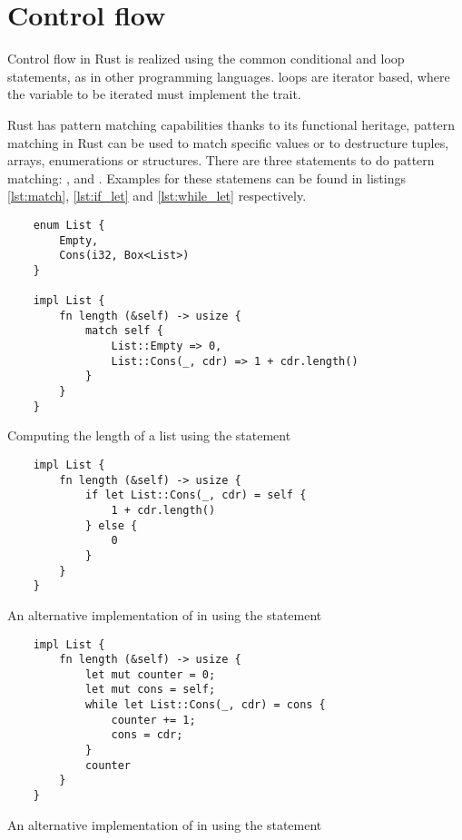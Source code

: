 \section{Control flow}

Control flow in Rust is realized using the common  conditional
and  loop statements, as in other programming languages.
 loops are iterator based, where the variable to be iterated must
implement the  trait.

Rust has pattern matching capabilities thanks to its functional heritage,
pattern matching in Rust can be used to match specific values or to destructure
tuples, arrays, enumerations or structures. There are three statements to do
pattern matching: ,  and .
Examples for these statemens can be found in listings \ref{lst:match},
\ref{lst:if_let} and \ref{lst:while_let} respectively.

\begin{listing}[ht]
	\begin{verbatim}
    enum List {
        Empty,
        Cons(i32, Box<List>)
    }

    impl List {
        fn length (&self) -> usize {
            match self {
                List::Empty => 0,
                List::Cons(_, cdr) => 1 + cdr.length()
            }
        } 
    }
    \end{verbatim}
    \caption{Computing the length of a list using the  statement}
  \label{lst:match}
\end{listing}

\begin{listing}[ht]
	\begin{verbatim}
    impl List {
        fn length (&self) -> usize {
            if let List::Cons(_, cdr) = self {
                1 + cdr.length()
            } else {
                0
            }
        } 
    }
    \end{verbatim}
    \caption{An alternative implementation of  in  using the  statement}
  \label{lst:if_let}
\end{listing}

\begin{listing}[ht]
	\begin{verbatim}
    impl List {
        fn length (&self) -> usize {
            let mut counter = 0;
            let mut cons = self;
            while let List::Cons(_, cdr) = cons {
                counter += 1;
                cons = cdr;
            }
            counter
        } 
    }
    \end{verbatim}
    \caption{An alternative implementation of  in 
    using the  statement}
  \label{lst:while_let}
\end{listing}


